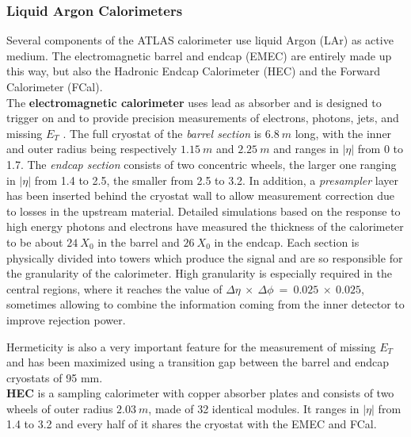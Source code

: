 \documentclass[a4paper,twoside,12pt]{article}
\begin{document}
\subsubsection*{Liquid Argon Calorimeters}\label{sec:LAr}
Several components of the ATLAS calorimeter use liquid Argon (LAr) as active medium\cite{current_EMCal}. The electromagnetic barrel and endcap (EMEC) are entirely made up this way, but also the Hadronic Endcap Calorimeter (HEC) and the Forward Calorimeter (FCal). \\[2pt]
The \textbf{electromagnetic calorimeter} uses lead as absorber and is designed to trigger on and to provide precision measurements of electrons, photons, jets, and missing $E_T$ .
The full cryostat of the \textit{barrel section} is $6.8\ m$ long, with the inner and outer radius being respectively $1.15\ m$ and $2.25\ m$ and ranges in $|\eta|$ from 0 to 1.7.  The \textit{endcap section} consists of two concentric wheels, the larger one ranging in $|\eta|$ from 1.4 to 2.5, the smaller from 2.5 to 3.2. In addition, a \textit{presampler} layer has been inserted behind the cryostat wall to allow measurement correction due to losses in the upstream material. 
Detailed simulations based on the response to high energy photons and electrons have
measured the thickness of the calorimeter to be about $24\ X_0$ in the barrel and $26\ X_0$ in the endcap. Each section is physically divided into towers which produce the signal and are so responsible
for the granularity of the calorimeter.
High granularity is especially required in the central regions, where it reaches the value of 
$\Delta\eta\ \times\ \Delta\phi\ =\ 0.025\ \times\ 0.025$, sometimes allowing to combine the information
coming from the inner detector to improve rejection power.

Hermeticity is also a very important feature for the measurement of missing $E_T$ and has been maximized using a transition gap between the barrel and endcap cryostats of 95 mm. \\

\textbf{HEC}\cite{hec} is a sampling calorimeter with copper absorber plates and consists of two wheels of outer radius $2.03\ m$, made of 32 identical modules. It ranges in $|\eta|$ from 1.4 to 3.2 and every half of it shares the cryostat with the EMEC and FCal. \\[2pt]
\end{document}
